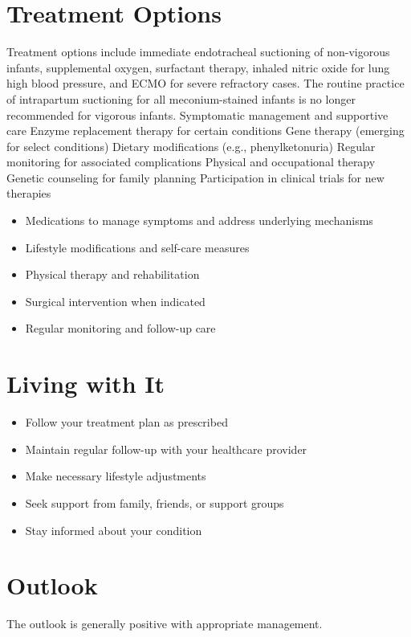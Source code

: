 \section{Treatment Options}
Treatment options include immediate endotracheal suctioning of non-vigorous infants, supplemental oxygen, surfactant therapy, inhaled nitric oxide for lung high blood pressure, and ECMO for severe refractory cases. The routine practice of intrapartum suctioning for all meconium-stained infants is no longer recommended for vigorous infants. Symptomatic management and supportive care Enzyme replacement therapy for certain conditions Gene therapy (emerging for select conditions) Dietary modifications (e.g., phenylketonuria) Regular monitoring for associated complications Physical and occupational therapy Genetic counseling for family planning Participation in clinical trials for new therapies

\begin{itemize}[noitemsep]
  \item Medications to manage symptoms and address underlying mechanisms
  \item Lifestyle modifications and self-care measures
  \item Physical therapy and rehabilitation
  \item Surgical intervention when indicated
  \item Regular monitoring and follow-up care
\end{itemize}
\section{Living with It}
\begin{itemize}[noitemsep]
  \item Follow your treatment plan as prescribed
  \item Maintain regular follow-up with your healthcare provider
  \item Make necessary lifestyle adjustments
  \item Seek support from family, friends, or support groups
  \item Stay informed about your condition
\end{itemize}
\section{Outlook}
The outlook is generally positive with appropriate management.
